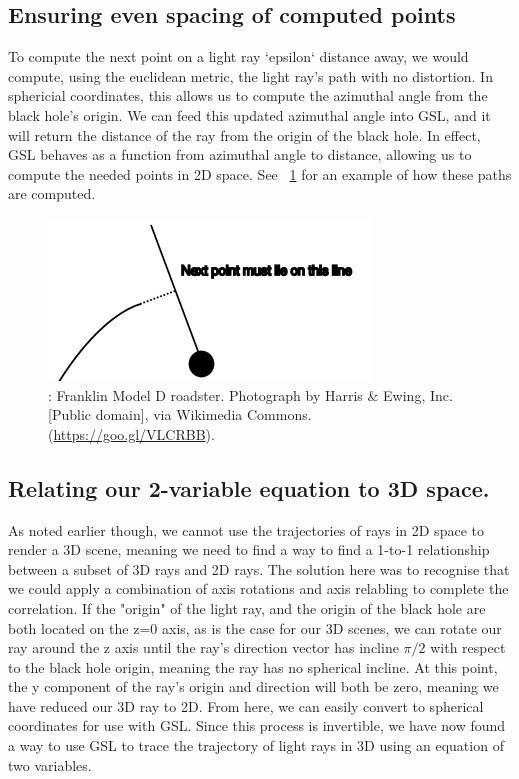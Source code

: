 \subsection {Ensuring even spacing of computed points}
To compute the next point on a light ray `epsilon` distance away, we would compute, using the euclidean metric, the light ray's path with no distortion. In sphericial coordinates, this allows us to compute the azimuthal angle from the black hole's origin. We can feed this updated azimuthal angle into GSL, and it will return the distance of the ray from the origin of the black hole. In effect, GSL behaves as a function from azimuthal angle to distance, allowing us to compute the needed points in 2D space. See ~\ref{fig:one} for an example of how these paths are computed.   
\begin{figure}[h]
  \centering
  \includegraphics[width=\linewidth]{nextpoint}
  \caption{: Franklin Model D roadster. Photograph by Harris \&
    Ewing, Inc. [Public domain], via Wikimedia
    Commons. (\url{https://goo.gl/VLCRBB}).}
    \label{fig:one}
\end{figure}

\subsection {Relating our 2-variable equation to 3D space.}
As noted earlier though, we cannot use the trajectories of rays in 2D space to render a 3D scene, meaning we need to find a way to find a 1-to-1 relationship between a subset of 3D rays and 2D rays. The solution here was to recognise that we could apply a combination of axis rotations and axis relabling to complete the correlation. If the "origin" of the light ray, and the origin of the black hole are both located on the z=0 axis, as is the case for our 3D scenes, we can rotate our ray around the z axis until the ray's direction vector has incline $ \pi / 2 $ with respect to the black hole origin, meaning the ray has no spherical incline. At this point, the y component of the ray's origin and direction will both be zero, meaning we have reduced our 3D ray to 2D. From here, we can easily convert to spherical coordinates for use with GSL. Since this process is invertible, we have now found a way to use GSL to trace the trajectory of light rays in 3D using an equation of two variables.

